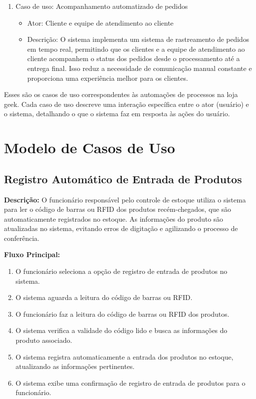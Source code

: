 \documentclass[
	12pt,				%
	openright,			%
	twoside,			%
	a4paper,			%
	english,			%
	brazil				%
	]{abntex2}
\begin{document}
\begin{enumerate}
    \item Caso de uso: Acompanhamento automatizado de pedidos
    \begin{itemize}
        \item Ator: Cliente e equipe de atendimento ao cliente
        \item Descrição: O sistema implementa um sistema de rastreamento de pedidos em tempo real, permitindo que os clientes e a equipe de atendimento ao cliente acompanhem o status dos pedidos desde o processamento até a entrega final. Isso reduz a necessidade de comunicação manual constante e proporciona uma experiência melhor para os clientes.
    \end{itemize}
\end{enumerate}

Esses são os casos de uso correspondentes às automações de processos na loja geek. Cada caso de uso descreve uma interação específica entre o ator (usuário) e o sistema, detalhando o que o sistema faz em resposta às ações do usuário.

\chapter{Modelo de Casos de Uso}\label{modelo_de_casos_de_uso}

\section*{ Registro Automático de Entrada de Produtos}

\textbf{Descrição:} O funcionário responsável pelo controle de estoque utiliza o sistema para ler o código de barras ou RFID dos produtos recém-chegados, que são automaticamente registrados no estoque. As informações do produto são atualizadas no sistema, evitando erros de digitação e agilizando o processo de conferência.

\textbf{Fluxo Principal:}
\begin{enumerate}
  \item O funcionário seleciona a opção de registro de entrada de produtos no sistema.
  \item O sistema aguarda a leitura do código de barras ou RFID.
  \item O funcionário faz a leitura do código de barras ou RFID dos produtos.
  \item O sistema verifica a validade do código lido e busca as informações do produto associado.
  \item O sistema registra automaticamente a entrada dos produtos no estoque, atualizando as informações pertinentes.
  \item O sistema exibe uma confirmação de registro de entrada de produtos para o funcionário.
\end{enumerate}
\end{document}
